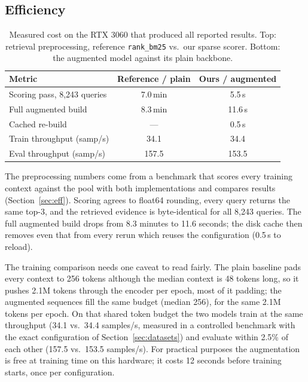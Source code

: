 \documentclass[10pt,twocolumn,twoside]{article}
\begin{document}
\subsection{Efficiency}\label{sec:efficiency}

\begin{table}[t]
\caption{Measured cost on the RTX 3060 that produced all reported results.
Top: retrieval preprocessing, reference \texttt{rank\_bm25} vs.\ our sparse
scorer. Bottom: the augmented model against its plain backbone.}
\label{tab:efficiency}
\begin{center}
\small
\begin{tabular}{lcc}
\toprule
\textbf{Metric} & \textbf{Reference / plain} & \textbf{Ours / augmented}\\
\midrule
Scoring pass, 8{,}243 queries & 7.0\,min   & 5.5\,s\\
Full augmented build          & 8.3\,min   & 11.6\,s\\
Cached re-build              & ---        & 0.5\,s\\
\midrule
Train throughput (samp/s)     & 34.1       & 34.4\\
Eval throughput (samp/s)      & 157.5      & 153.5\\
\bottomrule
\end{tabular}
\end{center}
\end{table}

The preprocessing numbers come from a benchmark that scores every training
context against the pool with both implementations and compares results
(Section~\ref{sec:eff}). Scoring agrees to float64 rounding, every query
returns the same top-3, and the retrieved evidence is byte-identical for all
8{,}243 queries. The full augmented build drops from 8.3 minutes to 11.6
seconds; the disk cache then removes even that from every rerun which
reuses the configuration (0.5\,s to reload).

The training comparison needs one caveat to read fairly. The plain baseline
pads every context to 256 tokens although the median context is 48 tokens
long, so it pushes 2.1M tokens through the encoder per epoch, most of it
padding; the augmented sequences fill the same budget (median 256), for the
same 2.1M tokens per epoch. On that shared token budget the two models train
at the same throughput (34.1 vs.\ 34.4 samples/s, measured in a controlled
benchmark with the exact configuration of Section~\ref{sec:datasets}) and
evaluate within 2.5\% of each other (157.5 vs.\ 153.5 samples/s). For
practical purposes the augmentation is free at training time on this
hardware; it costs 12 seconds before training starts, once per
configuration.
\end{document}
